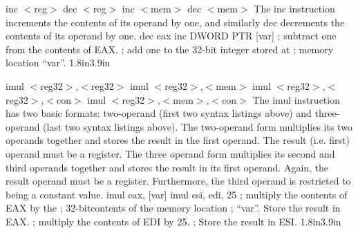 {inc $<$reg$>$ \hspace{0.5in} dec $<$reg$>$\newline
inc $<$mem$>$ \hspace{0.5in} dec $<$mem$>$}
{The inc instruction increments the contents of its operand by one,
  and similarly dec decrements the contents of its operand by one.}
{dec eax \newline inc DWORD PTR [var]}
{; subtract one from the contents of EAX. \newline
; add one to the 32-bit integer stored at \newline
; memory location ``var''.}
{1.8in}{3.9in}

{imul $<$reg32$>$,$<$reg32$>$\newline
imul $<$reg32$>$,$<$mem$>$\newline
imul $<$reg32$>$,$<$reg32$>$,$<$con$>$\newline
imul $<$reg32$>$,$<$mem$>$,$<$con$>$}
{The imul instruction has two basic formats: two-operand (first two
syntax listings above) and three-operand (last two syntax listings
above).  The two-operand form multiplies its two operands together and
stores the result in the first operand. The result (i.e. first)
operand must be a register.  The three operand form multiplies its
second and third operands together and stores the result in its first
operand. Again, the result operand must be a register.  Furthermore,
the third operand is restricted to being a constant value.}
{imul eax, [var]\newline\newline\newline
imul esi, edi, 25}
{; multiply the contents of EAX by the \newline
; 32-bitcontents of the memory location \newline
; ``var''. Store the result in EAX.\newline
; multiply the contents of EDI by 25. \newline
; Store the result in ESI.}
{1.8in}{3.9in}

